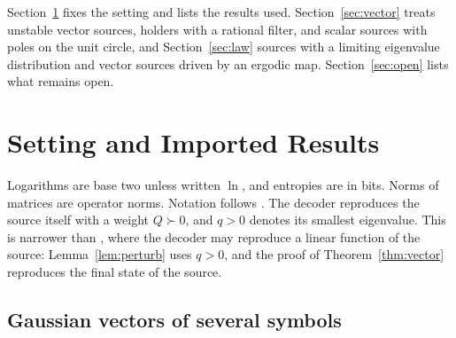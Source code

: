 \documentclass[11pt,onecolumn]{IEEEtran}
\begin{document}
Section~\ref{sec:model} fixes the setting and lists the results used.
Section~\ref{sec:vector} treats unstable vector sources, holders with a
rational filter, and scalar sources with poles on the unit circle, and
Section~\ref{sec:law} sources with a limiting eigenvalue distribution
and vector sources driven by an ergodic map.
Section~\ref{sec:open} lists what remains open.

\section{Setting and Imported Results}
\label{sec:model}

Logarithms are base two unless written $\ln$, and entropies are in
bits. Norms of matrices are operator norms. Notation follows
\cite{part1,part2,part3}. The decoder reproduces the source itself with
a weight $Q\succ0$, and $q>0$ denotes its smallest eigenvalue. This is
narrower than \cite{part1,part2,part3}, where the decoder may reproduce
a linear function of the source: Lemma~\ref{lem:perturb} uses $q>0$, and
the proof of Theorem~\ref{thm:vector} reproduces the final state of the
source.

\subsection{Gaussian vectors of several symbols}
\end{document}
